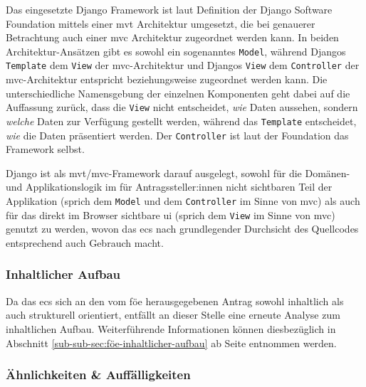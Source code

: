 \documentclass[a4paper,12pt,twoside]{scrreprt}
\begin{document}
Das eingesetzte Django Framework ist laut Definition der Django Software Foundation mittels einer \ac{mvt} Architektur umgesetzt, die bei genauerer Betrachtung auch einer \ac{mvc} Architektur zugeordnet werden kann. In beiden Architektur-Ansätzen gibt es sowohl ein sogenanntes \texttt{Model}, während Djangos \texttt{Template} dem \texttt{View} der \ac{mvc}-Architektur und Djangos \texttt{View} dem \texttt{Controller} der \ac{mvc}-Architektur entspricht beziehungsweise zugeordnet werden kann. Die unterschiedliche Namensgebung der einzelnen Komponenten geht dabei auf die Auffassung zurück, dass die \texttt{View} nicht entscheidet, \textit{wie} Daten aussehen, sondern \textit{welche} Daten zur Verfügung gestellt werden, während das \texttt{Template} entscheidet, \textit{wie} die Daten präsentiert werden. Der \texttt{Controller} ist laut der Foundation das Framework selbst. \cite{django_software_foundation_faq_2023}

\medskip

Django ist als \ac{mvt}/\ac{mvc}-Framework darauf ausgelegt, sowohl für die Domänen- und Applikationslogik im für Antragssteller:innen nicht sichtbaren Teil der Applikation (sprich dem \texttt{Model} und dem \texttt{Controller} im Sinne von \ac{mvc}) als auch für das direkt im Browser sichtbare \ac{ui} (sprich dem \texttt{View} im Sinne von \ac{mvc}) genutzt zu werden, wovon das \ac{ecs} nach grundlegender Durchsicht des Quellcodes entsprechend auch Gebrauch macht. \cite{ethics_commission_system_organization_ecs_2021}

\subsubsection*{Inhaltlicher Aufbau}
\label{sub-sub-sec:ecs-inhaltlicher-aufbau}

Da das \ac{ecs} sich an den vom \acl{föe} herausgegebenen Antrag sowohl inhaltlich als auch strukturell orientiert, entfällt an dieser Stelle eine erneute Analyse zum inhaltlichen Aufbau. Weiterführende Informationen können diesbezüglich in Abschnitt \ref{sub-sub-sec:föe-inhaltlicher-aufbau} ab Seite \pageref{sub-sub-sec:föe-inhaltlicher-aufbau} entnommen werden.

\subsubsection*{Ähnlichkeiten \& Auffälligkeiten}
\label{sub-sub-sec:ähnlichkeiten-auffälligkeiten-ecs}
\end{document}
